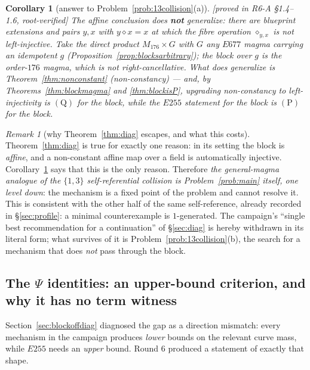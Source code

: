 \documentclass[11pt]{article}
\theoremstyle{plain}
\newtheorem{corollary}[theorem]{Corollary}
\theoremstyle{definition}
\theoremstyle{remark}
\newtheorem*{remark*}{Remark}
\numberwithin{equation}{section}
\newcommand{\statusbox}[1]{{\small\sloppy\textsf{[#1]}}}
\newcommand{\PROVED}[1]{\statusbox{proved in #1, root-verified}}
\begin{document}
\begin{corollary}[answer to Problem~\ref{prob:13collision}(a)]\label{cor:13answer}
\PROVED{R6-A \S1.4--1.6}
The affine conclusion does \textbf{not} generalize: there are blueprint extensions
and pairs $y,x$ with $y\diamond x = x$ at which the fibre operation
$\diamond_{y,x}$ is \emph{not} left-injective. Take the direct product
$M_{176}\times G$ with $G$ any $E677$ magma carrying an idempotent $g$
(Proposition~\ref{prop:blocksarbitrary}); the block over $g$ is the order-$176$
magma, which is not right-cancellative. What does generalize is
Theorem~\ref{thm:nonconstant} (non-constancy) --- and, by
Theorems~\ref{thm:blockmagma} and \ref{thm:blockisP}, upgrading non-constancy to
left-injectivity \emph{is} $(\mathrm{Q})$ for the block, while the $E255$
statement for the block \emph{is} $(\mathrm{P})$ for the block.
\end{corollary}

\begin{remark*}[why Theorem~\ref{thm:diag} escapes, and what this costs]
Theorem~\ref{thm:diag} is true for exactly one reason: in its setting the block is
\emph{affine}, and a non-constant affine map over a field is automatically
injective. Corollary~\ref{cor:13answer} says that this is the only reason.
Therefore \emph{the general-magma analogue of the $\{1,3\}$ self-referential
collision is Problem~\ref{prob:main} itself, one level down}: the mechanism is a
fixed point of the problem and cannot resolve it. This is consistent with the
other half of the same self-reference, already recorded in \S\ref{sec:profile}:
a minimal counterexample is $1$-generated. The campaign's ``single best
recommendation for a continuation'' of \S\ref{sec:diag} is hereby withdrawn in its
literal form; what survives of it is Problem~\ref{prob:13collision}(b), the search
for a mechanism that does \emph{not} pass through the block.
\end{remark*}

\subsection{The $\Psi$ identities: an upper-bound criterion, and why it has no
term witness}\label{sec:psi}

Section~\ref{sec:blockoffdiag} diagnosed the gap as a direction mismatch: every
mechanism in the campaign produces \emph{lower} bounds on the relevant curve mass,
while $E255$ needs an \emph{upper} bound. Round 6 produced a statement of exactly
that shape.
\end{document}
